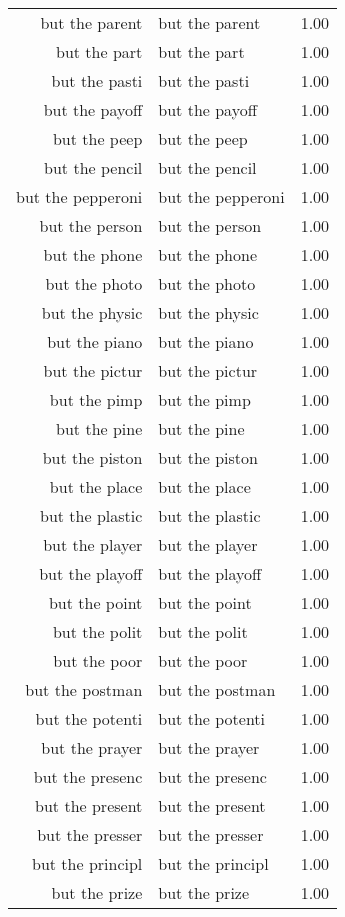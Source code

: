 \begin{table}[ht]
\begin{tabular}{rlr}
  but the parent & but the parent & 1.00 \\ 
  but the part & but the part & 1.00 \\ 
  but the pasti & but the pasti & 1.00 \\ 
  but the payoff & but the payoff & 1.00 \\ 
  but the peep & but the peep & 1.00 \\ 
  but the pencil & but the pencil & 1.00 \\ 
  but the pepperoni & but the pepperoni & 1.00 \\ 
  but the person & but the person & 1.00 \\ 
  but the phone & but the phone & 1.00 \\ 
  but the photo & but the photo & 1.00 \\ 
  but the physic & but the physic & 1.00 \\ 
  but the piano & but the piano & 1.00 \\ 
  but the pictur & but the pictur & 1.00 \\ 
  but the pimp & but the pimp & 1.00 \\ 
  but the pine & but the pine & 1.00 \\ 
  but the piston & but the piston & 1.00 \\ 
  but the place & but the place & 1.00 \\ 
  but the plastic & but the plastic & 1.00 \\ 
  but the player & but the player & 1.00 \\ 
  but the playoff & but the playoff & 1.00 \\ 
  but the point & but the point & 1.00 \\ 
  but the polit & but the polit & 1.00 \\ 
  but the poor & but the poor & 1.00 \\ 
  but the postman & but the postman & 1.00 \\ 
  but the potenti & but the potenti & 1.00 \\ 
  but the prayer & but the prayer & 1.00 \\ 
  but the presenc & but the presenc & 1.00 \\ 
  but the present & but the present & 1.00 \\ 
  but the presser & but the presser & 1.00 \\ 
  but the principl & but the principl & 1.00 \\ 
  but the prize & but the prize & 1.00 \\ 

\end{tabular}
\end{table}
